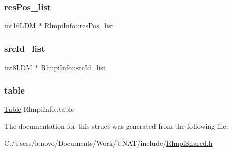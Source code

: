 \subsubsection{\texorpdfstring{resPos\_list}{resPos\_list}}
{\footnotesize\ttfamily \mbox{\hyperlink{include_2RlmpiShared_8h_a692aa037341791e306174d4669707b03}{int16\+L\+DM}} $\ast$ Rlmpi\+Info\+::res\+Pos\+\_\+list}

\mbox{\label{structRlmpiInfo_a143fcff092393e2bb5ba597929a76c53}} 
\subsubsection{\texorpdfstring{srcId\_list}{srcId\_list}}
{\footnotesize\ttfamily \mbox{\hyperlink{include_2RlmpiShared_8h_a69782ffde89d45e86308f10afedf08a6}{int8\+L\+DM}} $\ast$ Rlmpi\+Info\+::src\+Id\+\_\+list}

\mbox{\label{structRlmpiInfo_a220265259db4003f306b9a0fbeec5c53}} 
\subsubsection{\texorpdfstring{table}{table}}
{\footnotesize\ttfamily \mbox{\hyperlink{structTable}{Table}} Rlmpi\+Info\+::table}



The documentation for this struct was generated from the following file\+:\begin{DoxyCompactItemize}
\item 
C\+:/\+Users/lenovo/\+Documents/\+Work/\+U\+N\+A\+T/include/\mbox{\hyperlink{include_2RlmpiShared_8h}{Rlmpi\+Shared.\+h}}\end{DoxyCompactItemize}
